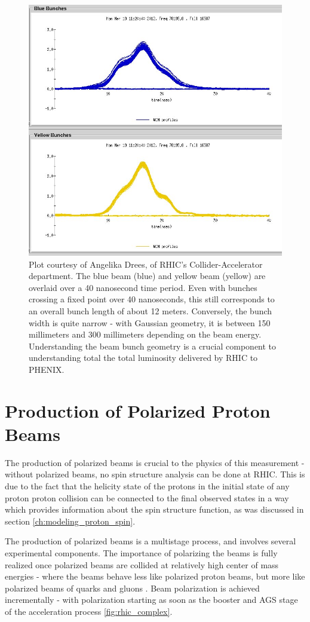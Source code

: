 \begin{figure}
  \centering
  \includegraphics[width=0.7\linewidth]{./figures/wcm_16587.jpeg}
  \caption{
    Plot courtesy of Angelika Drees, of RHIC's Collider-Accelerator 
    department. The blue beam (blue) and yellow beam (yellow) are overlaid over
    a 40 nanosecond time period. Even with bunches crossing a fixed point over
    40 nanoseconds, this still corresponds to an overall bunch length of about
    12 meters. Conversely, the bunch width is quite narrow - with Gaussian
    geometry, it is between 150 millimeters and 300 millimeters depending on the
    beam energy. Understanding the beam bunch geometry is a crucial component to
    understanding total the total luminosity delivered by RHIC to PHENIX.
  }
  \label{fig:bunch_profile_overlay}
\end{figure}

\clearpage
\section{Production of Polarized Proton Beams}

The production of polarized beams is crucial to the physics of this measurement
- without polarized beams, no spin structure analysis can be done at RHIC. This
is due to the fact that the helicity state of the protons in the initial state
of any proton proton collision can be connected to the final observed states in
a way which provides information about the spin structure function, as was
discussed in section \ref{ch:modeling_proton_spin}. 

The production of polarized beams is a multistage process, and involves several
experimental components. The importance of polarizing the beams is fully
realized once polarized beams are collided at relatively high center of mass
energies - where the beams behave less like polarized proton beams, but more
like polarized beams of quarks and gluons \cite{Alekseev2003}.  Beam
polarization is achieved incrementally - with polarization starting as soon as
the booster and AGS stage of the acceleration process \ref{fig:rhic_complex}.

